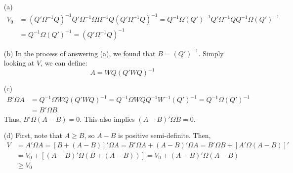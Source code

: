 \documentclass{article}
\newcommand{\oinv}{\Omega^{-1}}
\begin{document}
\begin{itemize}
	\item[(a)] 
		\begin{align*}
			V_0 &= (Q'\oinv Q)^{-1}Q'\oinv\Omega\oinv Q(Q'\oinv Q)^{-1} = Q^{-1}\Omega(Q')^{-1}Q'\oinv QQ^{-1}\Omega(Q')^{-1} 	\\
				&= Q^{-1}\Omega(Q')^{-1} = \left(Q'\oinv Q\right)^{-1}
		\end{align*}
	
	\item[(b)] In the process of answering (a), we found that ${B=(Q')^{-1}}$. Simply looking at $V$, we can define:
		\[
			A = WQ\left(Q'WQ\right)^{-1}
		\]
	
	\item[(c)]
		\begin{align*}
			B'\Omega A	&= Q^{-1}\Omega WQ\left(Q'WQ\right)^{-1} = Q^{-1}\Omega WQQ^{-1}W^{-1}(Q')^{-1} = Q^{-1}\Omega (Q')^{-1}	\\
						&= B'\Omega B
		\end{align*}
		Thus, ${B'\Omega(A-B)=0}$. This also implies ${(A-B)'\Omega B=0}$.
	
	\item[(d)] First, note that $A\geq B$, so $A-B$ is positive semi-definite. Then,
		\begin{align*}
			V	&= A'\Omega A = [B + (A-B)]'\Omega A = B'\Omega A + (A-B)'\Omega A = B'\Omega B  + [A'\Omega(A-B)]'	\\
				&= V_0 + [(A-B)'\Omega(B + (A-B))] = V_0 + (A-B)'\Omega(A-B)										\\
				&\geq V_0
		\end{align*}
		
	
\end{itemize}

\end{document}
